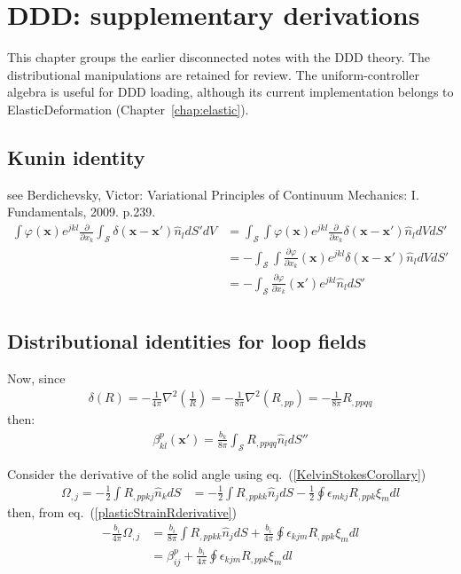 \chapter{DDD: supplementary derivations}
\begin{draftnote}
This chapter groups the earlier disconnected notes with the DDD theory. The distributional manipulations are retained for review. The uniform-controller algebra is useful for DDD loading, although its current implementation belongs to ElasticDeformation (Chapter~\ref{chap:elastic}).
\end{draftnote}
\section{Kunin identity}
see Berdichevsky, Victor: Variational Principles of Continuum Mechanics: I. Fundamentals, 2009. p.239.
\begin{align}
\int\varphi(\bm x)e^{jkl}\frac{\partial}{\partial x_k}\int_\mathcal{S} \delta(\bm x-\bm x')\hat{n}_ldS'dV&=\int_\mathcal{S} \int\varphi(\bm x)e^{jkl}\frac{\partial}{\partial x_k}\delta(\bm x-\bm x')\hat{n}_ldVdS'\nonumber\\
&=-\int_\mathcal{S} \int\frac{\partial\varphi}{\partial x_k}(\bm x)e^{jkl}\delta(\bm x-\bm x')\hat{n}_ldVdS'\nonumber\\
&=-\int_\mathcal{S} \frac{\partial\varphi}{\partial x_k}(\bm x')e^{jkl}\hat{n}_ldS'\nonumber\\
\end{align}


\section{Distributional identities for loop fields}

Now, since 
\begin{align}
\delta(R)=-\frac{1}{4\pi}\nabla^2\left(\frac{1}{R}\right)=-\frac{1}{8\pi}\nabla^2(R_{,pp})=-\frac{1}{8\pi}R_{,ppqq}
\end{align}
then:
\begin{align}
\beta^p_{kl}(\bm x')=\frac{b_k}{8\pi}\int_\mathcal{S} R_{,ppqq}\hat{n}_ldS''
\label{plasticStrainRderivative}
\end{align}



Consider the derivative of the solid angle using eq.~(\ref{KelvinStokesCorollary})
\begin{align}
\Omega_{,j}=-\frac{1}{2}\int R_{,ppkj}\hat{n}_kdS&=-\frac{1}{2}\int R_{,ppkk}\hat{n}_jdS-\frac{1}{2}\oint\epsilon_{mkj}R_{,ppk}\xi_mdl
\end{align}
then, from eq.~(\ref{plasticStrainRderivative})
\begin{align}
-\frac{b_i}{4\pi}\Omega_{,j}&=\frac{b_i}{8\pi}\int R_{,ppkk}\hat{n}_jdS+\frac{b_i}{4\pi}\oint\epsilon_{kjm}R_{,ppk}\xi_mdl\nonumber\\
&=\beta^p_{ij}+\frac{b_i}{4\pi}\oint\epsilon_{kjm}R_{,ppk}\xi_mdl
\end{align}

